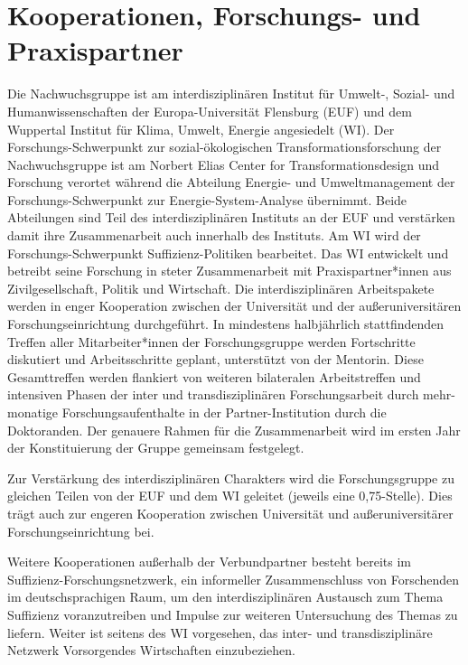\documentclass[a4paper,11pt,twoside]{scrartcl}
\begin{document}
\section{Kooperationen, Forschungs- und Praxispartner}

Die Nachwuchsgruppe ist am interdisziplinären Institut für Umwelt-, Sozial- und Humanwissenschaften der Europa-Universität Flensburg (EUF) und dem Wuppertal Institut für Klima, Umwelt, Energie angesiedelt (WI). Der Forschungs-Schwerpunkt zur sozial-ökologischen Transformationsforschung der Nachwuchsgruppe ist am Norbert Elias Center for Transformationsdesign und Forschung verortet während die Abteilung Energie- und Umweltmanagement der Forschungs-Schwerpunkt zur Energie-System-Analyse übernimmt. Beide Abteilungen sind Teil des interdisziplinären Instituts an der EUF und verstärken damit ihre Zusammenarbeit auch innerhalb des Instituts. Am WI wird der Forschungs-Schwerpunkt Suffizienz-Politiken bearbeitet. Das WI entwickelt und betreibt seine Forschung in steter Zusammenarbeit mit Praxispartner*innen aus Zivilgesellschaft, Politik und Wirtschaft. 
Die interdisziplinären Arbeitspakete werden in enger Kooperation zwischen der Universität und der außeruniversitären Forschungseinrichtung durchgeführt. In mindestens halbjährlich stattfindenden Treffen aller Mitarbeiter*innen der Forschungsgruppe werden Fortschritte diskutiert und Arbeitsschritte geplant, unterstützt von der Mentorin. Diese Gesamttreffen werden flankiert von weiteren bilateralen Arbeitstreffen und intensiven Phasen der inter und transdisziplinären Forschungsarbeit durch mehr-monatige Forschungsaufenthalte in der Partner-Institution durch die Doktoranden. Der genauere Rahmen für die Zusammenarbeit wird im ersten Jahr der Konstituierung der Gruppe gemeinsam festgelegt.

Zur Verstärkung des interdisziplinären Charakters wird die Forschungsgruppe zu gleichen Teilen von der EUF und dem WI geleitet (jeweils eine 0,75-Stelle). Dies trägt auch zur engeren Kooperation zwischen Universität und außeruniversitärer Forschungseinrichtung bei.

Weitere Kooperationen außerhalb der Verbundpartner besteht bereits im Suffizienz-Forschungsnetzwerk, ein informeller Zusammenschluss von Forschenden im deutschsprachigen Raum, um den interdisziplinären Austausch zum Thema Suffizienz voranzutreiben und Impulse zur weiteren Untersuchung des Themas zu liefern. Weiter ist seitens des WI vorgesehen, das inter- und transdisziplinäre Netzwerk Vorsorgendes Wirtschaften einzubeziehen.
\end{document}

